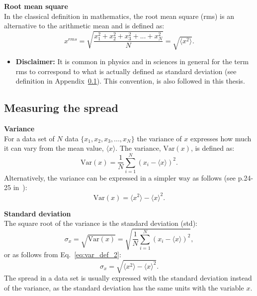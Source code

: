 \normalsize{\textbf{Root mean square}}\\
In the classical definition in mathematics, the root mean square (rms) is an alternative to the arithmetic mean and is defined as:
\begin{equation}\label{eq:rms_def}
    x^{rms} = \sqrt{\frac{x_1^2+x_2^2+x_3^2+...+x_N^2}{N}}=\sqrt{\langle x^2 \rangle}.
\end{equation}
\begin{itemize}
\item \textbf{Disclaimer:} It is common in physics and in sciences in general for the term rms to correspond to what is actually defined as standard deviation (see definition in Appendix~\ref{app:meas_spread}). This convention, is also followed in this thesis.
\end{itemize}
\subsection{Measuring the spread}\label{app:meas_spread}
\normalsize{\textbf{Variance}}\\
For a data set of $N$ data $\{ x_1, x_2, x_3, ..., x_N \}$ the variance of $x$  expresses how much it can vary from the mean value, $\langle x \rangle$. The variance, $\mathrm{Var}(x)$, is defined as:
\begin{equation}\label{eq:var_def_1}
    \mathrm{Var}(x) = \frac{1}{N} \sum_{i=1}^{N} (x_i-\langle x \rangle)^2.
\end{equation}
Alternatively, the variance can be expressed in a simpler way as follows (see p.24-25 in~\cite{lvp.b313005720130101}):
\begin{equation}\label{eq:var_def_2}
    \mathrm{Var}(x) = \langle x^2 \rangle - \langle x \rangle^2.
\end{equation}

\normalsize{\textbf{Standard deviation}}\\
The square root of the variance is the standard deviation (std):
\begin{equation}\label{eq:std_def_1}
    \sigma_x = \sqrt{\mathrm{Var}(x)} = \sqrt{\frac{1}{N} \sum_{i=1}^{N} (x_i-\langle x \rangle)^2},
\end{equation}
or as follows from Eq.~\eqref{eq:var_def_2}:
\begin{equation}\label{eq:std_def_2}
    \sigma_x = \sqrt{\langle x^2 \rangle - \langle x \rangle^2}.
\end{equation}
The spread in a data set is usually expressed with the standard deviation instead of the variance, as the standard deviation has the same units with the variable $x$.

